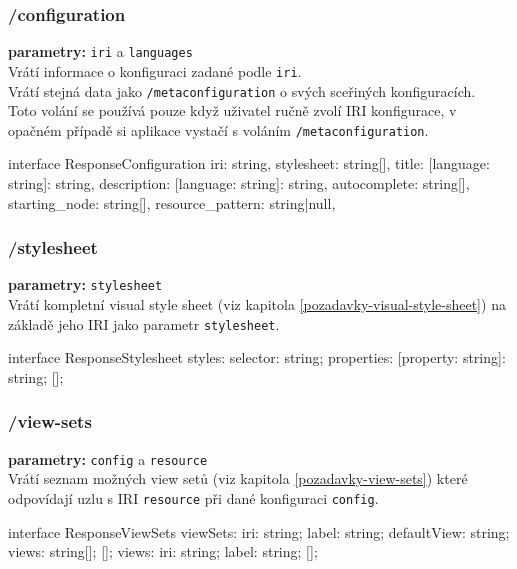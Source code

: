 \subsubsection{/configuration}
\textbf{parametry:} \texttt{iri} a \texttt{languages} \\
Vrátí informace o konfiguraci zadané podle \texttt{iri}. \\
Vrátí stejná data jako \texttt{/metaconfiguration} o svých sceřiných konfiguracích. \\
Toto volání se používá pouze když uživatel ručně zvolí IRI konfigurace, v opačném případě si aplikace vystačí s voláním \texttt{/metaconfiguration}.

\begin{code}
interface ResponseConfiguration {
    iri: string,
    stylesheet: string[],
    title: {[language: string]: string},
    description: {[language: string]: string},
    autocomplete: string[],
    starting_node: string[],
    resource_pattern: string|null,
}
\end{code}

\subsubsection{/stylesheet}
\textbf{parametry:} \texttt{stylesheet} \\
Vrátí kompletní visual style sheet (viz kapitola \ref{pozadavky-visual-style-sheet}) na základě jeho IRI jako parametr \texttt{stylesheet}.

\begin{code}
interface ResponseStylesheet {
    styles: {
        selector: string;
        properties: {
            [property: string]: string;
        }
    }[];
}
\end{code}

\subsubsection{/view-sets}
\textbf{parametry:} \texttt{config} a \texttt{resource} \\
Vrátí seznam možných view setů (viz kapitola \ref{pozadavky-view-sets}) které odpovídají uzlu s IRI \texttt{resource} při dané konfiguraci \texttt{config}.

\begin{code}
interface ResponseViewSets {
    viewSets: {
        iri: string;
        label: string;
        defaultView: string;
        views: string[];
    }[];
    views: {
        iri: string;
        label: string;
    }[];
}
\end{code}

